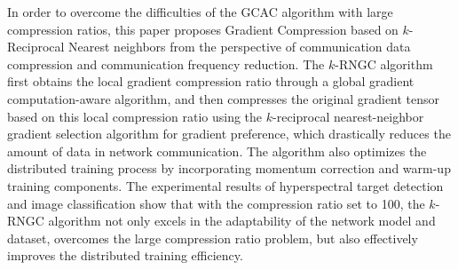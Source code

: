 In order to overcome the difficulties of the GCAC algorithm with large compression ratios, this paper proposes Gradient Compression based on $k$-Reciprocal Nearest neighbors from the perspective of communication data compression and communication frequency reduction.
The $k$-RNGC algorithm first obtains the local gradient compression ratio through a global gradient computation-aware algorithm, 
and then compresses the original gradient tensor based on this local compression ratio using the $k$-reciprocal nearest-neighbor gradient selection algorithm for gradient preference, which drastically reduces the amount of data in network communication.
The algorithm also optimizes the distributed training process by incorporating momentum correction and warm-up training components.
The experimental results of hyperspectral target detection and image classification show that with the compression ratio set to 100,
the $k$-RNGC algorithm not only excels in the adaptability of the network model and dataset, overcomes the large compression ratio problem, but also effectively improves the distributed training efficiency.
